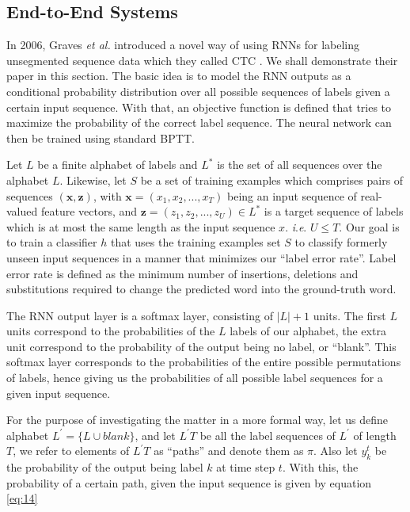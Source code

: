 \subsection{End-to-End Systems} 
\label{bg:s3_sub2}


In 2006, Graves \textit{et al.} introduced a novel way of using \ac{RNN}s for labeling unsegmented sequence data which they called \ac{CTC} \cite{graves2006connectionist}. We shall demonstrate their paper in this section. 
The basic idea is to model the \ac{RNN} outputs as a conditional probability distribution over all possible sequences of labels given a certain input sequence. With that, an objective function is defined that tries to maximize the probability of the correct label sequence. The neural network can then be trained using standard \ac{BPTT}.

Let $L$ be a finite alphabet of labels and $L^*$ is the set of all sequences over the alphabet $L$. Likewise, let $S$ be a set of training examples which comprises pairs of sequences $(\mathbf{x},\mathbf{z})$, with $\mathbf{x} = (x_1, x_2,..., x_T)$ being an input sequence of real-valued feature vectors, and $\mathbf{z} = (z_1, z_2,..., z_U) \in L^*$ is a target sequence of labels which is at most the same length as the input sequence $x$. \textit{i}.\textit{e}. $U \leq T$. Our goal is to train a classifier $h$ that uses the training examples set $S$ to classify formerly unseen input sequences in a manner that minimizes our \enquote{label error rate}. Label error rate is defined as the minimum number of insertions, deletions and substitutions required to change the predicted word into the ground-truth word.

The \ac{RNN} output layer is a softmax layer, consisting of $|L|+1$ units. The first $L$ units correspond to the probabilities of the $L$ labels of our alphabet, the extra unit correspond to the probability of the output being no label, or \enquote{blank}. This softmax layer corresponds to the probabilities of the entire possible permutations of labels, hence giving us the probabilities of all possible label sequences for a given input sequence.


For the purpose of investigating the matter in a more formal way, let us define alphabet $L^{'} = \{L \cup {blank}\}$, and let ${L^{'}T}$ be all the label sequences of $L^{'}$ of length $T$, we refer to elements of ${L^{'}T}$ as \enquote{paths} and denote them as $\pi$. Also let $y_{k}^{t}$ be the probability of the output being label $k$ at time step $t$. With this, the probability of a certain path, given the input sequence is given by equation \ref{eq:14}


